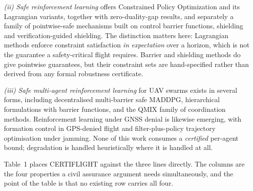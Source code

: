 \documentclass[11pt,a4paper]{article}
\begin{document}
\emph{(ii) Safe reinforcement learning} offers Constrained Policy Optimization and its Lagrangian variants, together with zero-duality-gap results, and separately a family of pointwise-safe mechanisms built on control barrier functions, shielding and verification-guided shielding. The distinction matters here: Lagrangian methods enforce constraint satisfaction \emph{in expectation} over a horizon, which is not the guarantee a safety-critical flight requires. Barrier and shielding methods do give pointwise guarantees, but their constraint sets are hand-specified rather than derived from any formal robustness certificate.

\emph{(iii) Safe multi-agent reinforcement learning} for UAV swarms exists in several forms, including decentralised multi-barrier safe MADDPG, hierarchical formulations with barrier functions, and the QMIX family of coordination methods. Reinforcement learning under GNSS denial is likewise emerging, with formation control in GPS-denied flight and filter-plus-policy trajectory optimisation under jamming. None of this work consumes a \emph{certified} per-agent bound; degradation is handled heuristically where it is handled at all.

Table~1 places CERTIFLIGHT against the three lines directly. The columns are
the four properties a civil assurance argument needs simultaneously, and the
point of the table is that no existing row carries all four.
\end{document}

